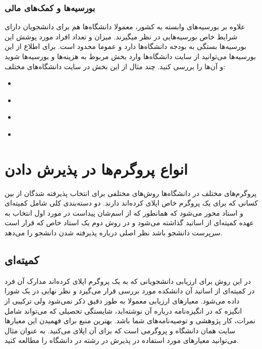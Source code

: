 \subsubsection{بورسیه‌ها و کمک‌های مالی}
علاوه بر بورسیه‌های وابسته به کشور، معمولا دانشگاه‌ها هم برای دانشجویان دارای شرایط خاص بورسیه‌هایی در نظر میگیرند. میزان و تعداد افراد 
مورد پوشش این بورسیه‌ها بستگی به بودجه دانشگاه‌ها دارد و عموما محدود است. برای اطلاع از این بورسیه‌ها می‌توانید از سایت دانشگاه‌ها وارد بخش 
مربوط به هزینه‌ها و بورسیه‌ها شوید و آن‌ها را بررسی کنید. چند مثال از این بخش در سایت دانشگاه‌های مختلف:


\begin{itemize}[leftmargin=1.5cm]
  \item \href{https://www.polimi.it/en/prospective-students/how-much-does-it-cost/scholarships}{}
  \item \href{https://www.kuleuven.be/scholarships/year}{} 
  \item \href{https://erasmus-plus.ec.europa.eu/opportunities/individuals/students/erasmus-mundus-joint-masters}{} 
  \item \href{https://www.daad.de/en/studying-in-germany/scholarships/daad-scholarships/}{} 
  
\end{itemize}


\section{انواع پروگرم‌ها در پذیرش دادن}
پروگرم‌های مختلف در دانشگاه‌ها روش‌های مختلفی برای انتخاب پذیرفته شدگان از بین کسانی که برای یک پروگرم خاص اپلای کرده‌اند دارند. 
دو دسته‌بندی کلی شامل کمیته‌ای و استاد محور می‌شود که همانطور که از اسم‌شان پیداست در مورد اول انتخاب به عهده‌ کمیته‌ای از اساتید
گذاشته می‌شود و در روش دوم یک استاد خاص که قرار است سرپرست دانشجو باشد نظر اصلی درباره پذیرفته شدن دانشجو را می‌دهد. 

\subsection{کمیته‌ای}
در این  روش برای ارزیابی دانشجویانی که به یک پروگرم اپلای کرده‌اند مدارک آن فرد در کمیته‌ای از اساتید آن دانشکده 
مورد بررسی قرار می‌گیرد و نظر نهایی در یک شورا داده می‌شود. معیار‌های ارزیابی معمولا به طور دقیق ذکر نمی‌شود ولی ترکیبی از انگیزه که در انگیزه‌نامه 
درباره آن نوشته‌اید، شایستگی تحصیلی که می‌تواند شامل نمرات، کار پژوهشی و توصیه‌نامه‌های شما باشد. بهترین منبع برای فهمیدن 
این معیار‌ها سایت همان دانشگاه و پروگرمی است که برای آن اپلای می‌کنید. به عنوان مثال می‌توانید معیار‌های مورد استفاده در پذیرش در 
رشته  در دانشگاه  را مطالعه کنید.

